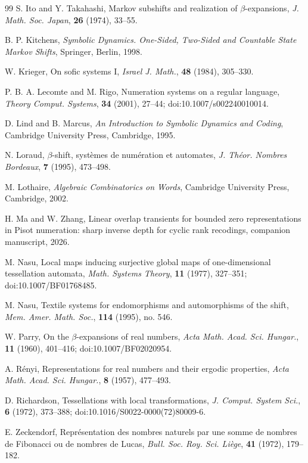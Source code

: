 \begin{thebibliography}{99}
S. Ito and Y. Takahashi, Markov subshifts and realization of
$\beta$-expansions, \textit{J. Math. Soc. Japan}, \textbf{26} (1974), 33--55.

B. P. Kitchens, \textit{Symbolic Dynamics. One-Sided, Two-Sided and Countable State Markov Shifts}, Springer, Berlin, 1998.

W. Krieger, On sofic systems I, \textit{Israel J. Math.}, \textbf{48} (1984), 305--330.

P. B. A. Lecomte and M. Rigo, Numeration systems on a regular language,
\textit{Theory Comput. Systems}, \textbf{34} (2001), 27--44;
doi:10.1007/s002240010014.

D. Lind and B. Marcus, \textit{An Introduction to Symbolic Dynamics and Coding}, Cambridge University Press, Cambridge, 1995.

N. Loraud, $\beta$-shift, syst\`emes de num\'eration et automates,
\textit{J. Th\'eor. Nombres Bordeaux}, \textbf{7} (1995), 473--498.

M. Lothaire, \textit{Algebraic Combinatorics on Words}, Cambridge University Press, Cambridge, 2002.

 H. Ma and W. Zhang, Linear overlap transients for bounded zero representations in Pisot numeration: sharp inverse depth for cyclic rank recodings, companion manuscript, 2026.

M. Nasu, Local maps inducing surjective global maps of one-dimensional
tessellation automata,
\textit{Math. Systems Theory}, \textbf{11} (1977), 327--351;
doi:10.1007/BF01768485.

M. Nasu, Textile systems for endomorphisms and automorphisms of the shift, \textit{Mem. Amer. Math. Soc.}, \textbf{114} (1995), no. 546.

W. Parry, On the $\beta$-expansions of real numbers, \textit{Acta Math. Acad. Sci. Hungar.}, \textbf{11} (1960), 401--416; doi:10.1007/BF02020954.

A. R\'enyi, Representations for real numbers and their ergodic properties,
\textit{Acta Math. Acad. Sci. Hungar.}, \textbf{8} (1957), 477--493.

D. Richardson, Tessellations with local transformations,
\textit{J. Comput. System Sci.}, \textbf{6} (1972), 373--388;
doi:10.1016/S0022-0000(72)80009-6.

E. Zeckendorf, Repr\'esentation des nombres naturels par une somme de nombres de Fibonacci ou de nombres de Lucas, \textit{Bull. Soc. Roy. Sci. Li\`ege}, \textbf{41} (1972), 179--182.

\end{thebibliography}
